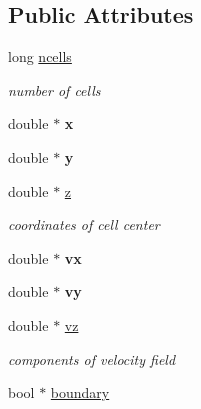 \subsection*{Public Attributes}
\begin{DoxyCompactItemize}
\item 
\mbox{\label{classCELLS_afa68f6d1c3bd858386ce31ad0b9ccc01}} 
long \mbox{\hyperlink{classCELLS_afa68f6d1c3bd858386ce31ad0b9ccc01}{ncells}}
\begin{DoxyCompactList}\small\item\em number of cells \end{DoxyCompactList}\item 
\mbox{\label{classCELLS_ad5ed46172bdcb05c9d9e46ff24ae6ebe}} 
double $\ast$ {\bfseries x}
\item 
\mbox{\label{classCELLS_a30ac0bd9219de8edd669d392731799b4}} 
double $\ast$ {\bfseries y}
\item 
\mbox{\label{classCELLS_af14421c93ce2c1313087438d13e7f8d4}} 
double $\ast$ \mbox{\hyperlink{classCELLS_af14421c93ce2c1313087438d13e7f8d4}{z}}
\begin{DoxyCompactList}\small\item\em coordinates of cell center \end{DoxyCompactList}\item 
\mbox{\label{classCELLS_a6d47a822e00c450666ee6ab23980f6ba}} 
double $\ast$ {\bfseries vx}
\item 
\mbox{\label{classCELLS_a2b9482486a5cee760686a4314463d95f}} 
double $\ast$ {\bfseries vy}
\item 
\mbox{\label{classCELLS_af00df9453d54da97dd6280864a897e52}} 
double $\ast$ \mbox{\hyperlink{classCELLS_af00df9453d54da97dd6280864a897e52}{vz}}
\begin{DoxyCompactList}\small\item\em components of velocity field \end{DoxyCompactList}\item 
\mbox{\label{classCELLS_aa01cd7adebe3c9813cf9b2a31662060c}} 
bool $\ast$ \mbox{\hyperlink{classCELLS_aa01cd7adebe3c9813cf9b2a31662060c}{boundary}}

\end{DoxyCompactItemize}
